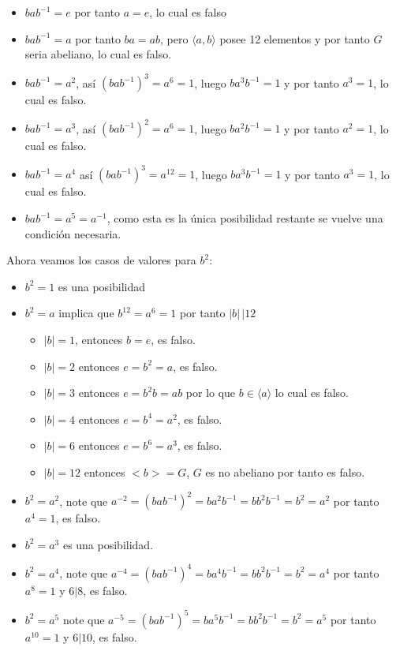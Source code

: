 \begin{homeworkProblem}
\begin{solucion}
    \begin{itemize}
        \item $bab^{-1}=e$ por tanto $a=e$, lo cual es falso
        \item $bab^{-1}=a$ por tanto $ba=ab$, pero $\langle a,b\rangle$ posee 12 elementos y por tanto $G$ seria abeliano, lo cual es falso.
        \item $bab^{-1}=a^2$, así $(bab^{-1})^3=a^6=1$, luego $ba^3b^{-1}=1$ y por tanto $a^3=1$, lo cual es falso.
        \item $bab^{-1}=a^3$, así $(bab^{-1})^2=a^6=1$, luego $ba^2b^{-1}=1$ y por tanto $a^2=1$, lo cual es falso.
        \item $bab^{-1}=a^4$ así $(bab^{-1})^3=a^12=1$, luego $ba^3b^{-1}=1$ y por tanto $a^3=1$, lo cual es falso.
        \item $bab^{-1}=a^5=a^{-1}$, como esta es la única posibilidad restante se vuelve una condición necesaria.
    \end{itemize}
    Ahora veamos los casos de valores para $b^2$:
    \begin{itemize}
        \item $b^2=1$ es una posibilidad
        \item $b^2=a$ implica que $b^12=a^6=1$ por tanto $|b|\,|12$
        \begin{itemize}
            \item $|b|=1$, entonces $b=e$, es falso.
            \item $|b|=2$ entonces $e=b^2=a$, es falso.
            \item $|b|=3$ entonces $e=b^2b=ab$ por lo que $b\in\langle a\rangle$ lo cual es falso.
            \item $|b|=4$ entonces $e=b^4=a^2$, es falso.
            \item $|b|=6$ entonces $e=b^6=a^3$, es falso.
            \item $|b|=12$ entonces $<b>=G$, $G$ es no abeliano por tanto es falso.
        \end{itemize}
    \item $b^2=a^2$, note que $a^{-2}=(bab^{-1})^2=ba^2b^{-1}=bb^2b^{-1}=b^2=a^2$ por tanto $a^4=1$, es falso.
    \item $b^2=a^3$ es una posibilidad.
    \item $b^2=a^4$, note que $a^{-4}=(bab^{-1})^4=ba^4b^{-1}=bb^2b^{-1}=b^2=a^4$ por tanto $a^8=1$ y $6|8$, es falso.
    \item $b^2=a^5$ note que $a^{-5}=(bab^{-1})^5=ba^5b^{-1}=bb^2b^{-1}=b^2=a^5$ por tanto $a^{10}=1$ y $6|10$, es falso.

\end{itemize}
\end{solucion}
\end{homeworkProblem}

